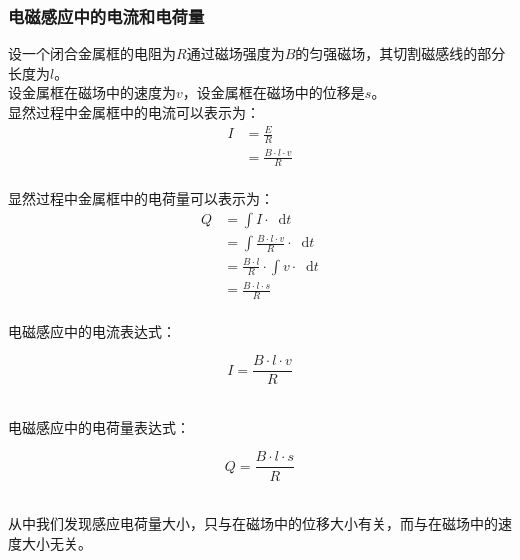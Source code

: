\documentclass[UTF8]{ctexart}
\newcommand*{\dif}{\mathop{}\!\mathrm{d}}
\begin{document}
\newpage

\subsubsection{电磁感应中的电流和电荷量}
    设一个闭合金属框的电阻为$R$通过磁场强度为$B$的匀强磁场，其切割磁感线的部分长度为$l$。\\[3mm]
    设金属框在磁场中的速度为$v$，设金属框在磁场中的位移是$s$。\\[4mm]
    显然过程中金属框中的电流可以表示为：
    \begin{align}
        I
        &=\frac{E}{R}\\[4mm]
        &=\frac{B\cdot l\cdot v}{R}
    \end{align}\\
    显然过程中金属框中的电荷量可以表示为：
    \setcounter{equation}{0}
    \begin{align}
        Q
        &=\int I\cdot\dif t\\[4mm]
        &=\int \frac{B\cdot l\cdot v}{R}\cdot\dif t\\[4mm]
        &=\frac{B\cdot l}{R}\cdot\int v\cdot\dif t\\[4mm]
        &=\frac{B\cdot l\cdot s}{R} 
    \end{align}\\
    电磁感应中的电流表达式：
    \begin{large}
        \begin{equation*}
            I=\frac{B\cdot l\cdot v}{R}
        \end{equation*}
    \end{large}\\
    电磁感应中的电荷量表达式：
    \begin{large}
        \begin{equation*}
            Q=\frac{B\cdot l\cdot s}{R}
        \end{equation*}
    \end{large}\\
    从中我们发现感应电荷量大小，只与在磁场中的位移大小有关，而与在磁场中的速度大小无关。

\newpage


\end{document}
